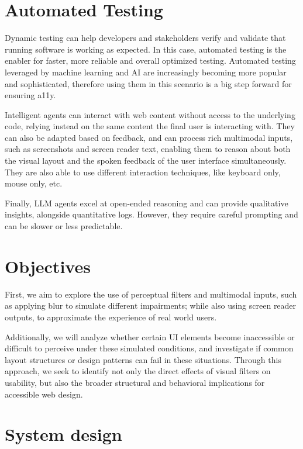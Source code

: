 \section{Automated Testing}

Dynamic testing can help developers and stakeholders verify and validate that running software is working as expected\cite{vasquez2018continuous}. In this case, automated testing is the enabler for faster, more reliable and overall optimized testing. Automated testing leveraged by machine learning and \ac{AI} are increasingly becoming more popular and sophisticated, therefore using them in this scenario is a big step forward for ensuring \ac{a11y}.

Intelligent agents can interact with web content without access to the underlying code, relying instead on the same content the final user is interacting with\cite{lanham2025ai, wang2024survey, lu2025uxagent}. They can also be adapted based on feedback, and can process rich multimodal inputs, such as screenshots and screen reader text, enabling them to reason about both the visual layout and the spoken feedback of the user interface simultaneously. They are also able to use different interaction techniques, like keyboard only, mouse only, etc. 

Finally, LLM agents excel at open-ended reasoning and can provide qualitative insights, alongside quantitative logs. However, they require careful prompting and can be slower or less predictable.
\vspace{-8pt}

\section{Objectives}

First, we aim to explore the use of perceptual filters and multimodal inputs, such as applying blur to simulate different impairments; while also using screen reader outputs, to approximate the experience of real world users. 

Additionally, we will analyze whether certain \ac{UI} elements become inaccessible or difficult to perceive under these simulated conditions, and investigate if common layout structures or design patterns can fail in these situations. Through this approach, we seek to identify not only the direct effects of visual filters on usability, but also the broader structural and behavioral implications for accessible web design.

\section{System design}

